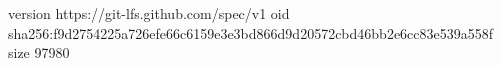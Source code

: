 version https://git-lfs.github.com/spec/v1
oid sha256:f9d2754225a726efe66c6159e3e3bd866d9d20572cbd46bb2e6cc83e539a558f
size 97980
